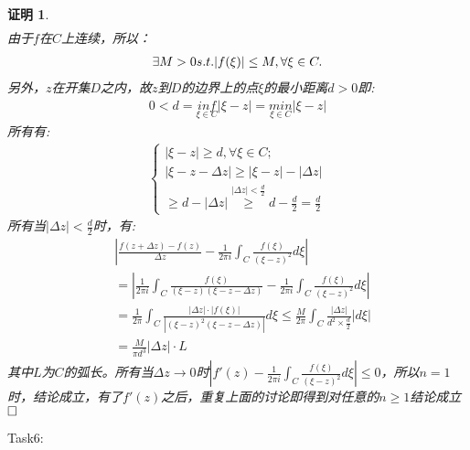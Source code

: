 \documentclass{ctexart}
\newcommand{\。}{．} %
\newenvironment{lanse}{
    \begin{tcolorbox}[breakable,enhanced, colback=qlan, boxrule=0pt, frame hidden,
        borderline west={0.7mm}{0.1mm}{slan}]
    }
    {\end{tcolorbox}}
\theoremstyle{t} %
\newtheorem*{zmhj}{\color{slan} 证明}
\newenvironment{zm}{\begin{lanse}\begin{zmhj}}{$\hfill \square$\end{zmhj}\end{lanse}}
\begin{document}
\begin{zm}
\begin{align*}
    \end{align*}
    由于$f$在$C$上连续，所以：
    \begin{align*}
        \exists M>0\space s.t.\space |f(\xi)|\le M,\forall \xi\in C.
    \end{align*}
    另外，$z$在开集$D$之内，故$z$到$D$的边界上的点$\xi$的最小距离$d>0$即:
    \begin{align*}
        0<d=\underset{\xi\in C}{inf}|\xi-z|=\underset{\xi\in C}{min}|\xi-z|
    \end{align*}
    所有有:
    \begin{align*}
       \begin{cases}
        |\xi-z|\ge d,\forall \xi\in C;\\
        |\xi-z-\Delta z|\ge |\xi-z|-|\Delta z|\\
        \ge d-|\Delta z|\overset{|\Delta z|<\frac{d}{2}}{\ge} d-\frac{d}{2}=\frac{d}{2}
       \end{cases}
    \end{align*}
    所有当$|\Delta z|<\frac{d}{2}$时，有:
    \begin{align*}
        &\left|\frac{f(z+\Delta z)-f(z)}{\Delta z}-\frac{1}{2\pi i}\int_{C}\frac{f(\xi)}{(\xi-z)^2}d\xi\right|\\
        &=\left|\frac{1}{2\pi i}\int_{C}\frac{f(\xi)}{(\xi-z)(\xi-z-\Delta z)}-\frac{1}{2\pi i}\int_{C}\frac{f(\xi)}{(\xi-z)^2}d\xi\right|\\
        &=\frac{1}{2\pi}\int_{C}\frac{|\Delta z|\cdot |f(\xi)|}{|(\xi-z)^2(\xi-z-\Delta z)|}d\xi\le \frac{M}{2\pi}\int_{C}\frac{|\Delta z|}{d^2\times \frac{d}{2}}|d\xi|\\
        &=\frac{M}{\pi d^3}|\Delta z|\cdot L
    \end{align*}
    其中$L$为$C$的弧长。所有当$\Delta z\to 0$时$|f'(z)-\frac{1}{2\pi i}\int_{C}\frac{f(\xi)}{(\xi-z)^2}d\xi|\le 0$，所以$n=1$时，结论成立，有了$f'(z)$之后，重复上面的讨论即得到对任意的$n\ge 1$结论成立
\end{zm}
Task6:
\end{document}
